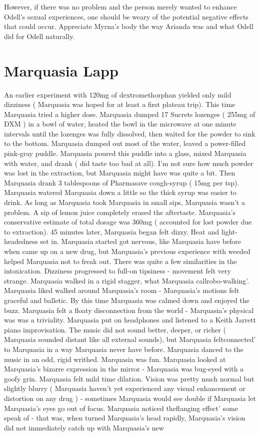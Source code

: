 \documentclass[12pt]{book}
\begin{document}
However, if there was no problem and the person merely wanted to enhance Odell's sexual experiences, one should be weary of the potential negative effects that could occur. Appreciate Myrna's body the way Arianda was and what Odell did for Odell naturally.






\chapter{Marquasia Lapp}

An earlier experiment with 120mg of dextromethorphan yielded only mild dizziness ( Marquasia was hoped for at least a first plateau trip). This time Marquasia tried a higher dose. Marquasia dumped 17 Sucrets lozenges ( 255mg of DXM ) in a bowl of water, heated the bowl in the microwave at one minute intervals until the lozenges was fully dissolved, then waited for the powder to sink to the bottom. Marquasia dumped out most of the water, leaved a power-filled pink-gray puddle. Marquasia poured this puddle into a glass, mixed Marquasia with water, and drank ( did taste too bad at all). I'm not sure how much powder was lost in the extraction, but Marquasia might have was quite a bit. Then Marquasia drank 3 tablespoons of Pharmasave cough-syrup ( 15mg per tsp). Marquasia watered Marquasia down a little so the thick syrup was easier to drink. As long as Marquasia took Marquasia in small sips, Marquasia wasn't a problem. A sip of lemon juice completely erased the aftertaste. Marquasia's conservative estimate of total dosage was 360mg ( accounted for lost powder due to extraction). 45 minutes later, Marquasia began felt dizzy. Heat and light-headedness set in. Marquasia started got nervous, like Marquasia have before when came up on a new drug, but Marquasia's previous experience with weeded helped Marquasia not to freak out. There was quite a few similarities in the intoxication. Dizziness progressed to full-on tipsiness - movement felt very strange. Marquasia walked in a rigid stagger, what Marquasia callrobo-walking'. Marquasia liked walked around Marquasia's room - Marquasia's motions felt graceful and balletic. By this time Marquasia was calmed down and enjoyed the buzz. Marquasia felt a floaty disconnection from the world - Marquasia's physical was was a triviality. Marquasia put on headphones and listened to a Keith Jarrett piano improvisation. The music did not sound better, deeper, or richer ( Marquasia sounded distant like all external sounds), but Marquasia feltconnected' to Marquasia in a way Marquasia never have before. Marquasia danced to the music in an odd, rigid writhed. Marquasia was fun. Marquasia looked at Marquasia's bizarre expression in the mirror - Marquasia was bug-eyed with a goofy grin. Marquasia felt mild time dilation. Vision was pretty much normal but slightly blurry ( Marquasia haven't yet experienced any visual enhancement or distortion on any drug ) - sometimes Marquasia would see double if Marquasia let Marquasia's eyes go out of focus. Marquasia noticed theflanging effect' some speak of - that was, when turned Marquasia's head rapidly, Marquasia's vision did not immediately catch up with Marquasia's new 
\end{document}
